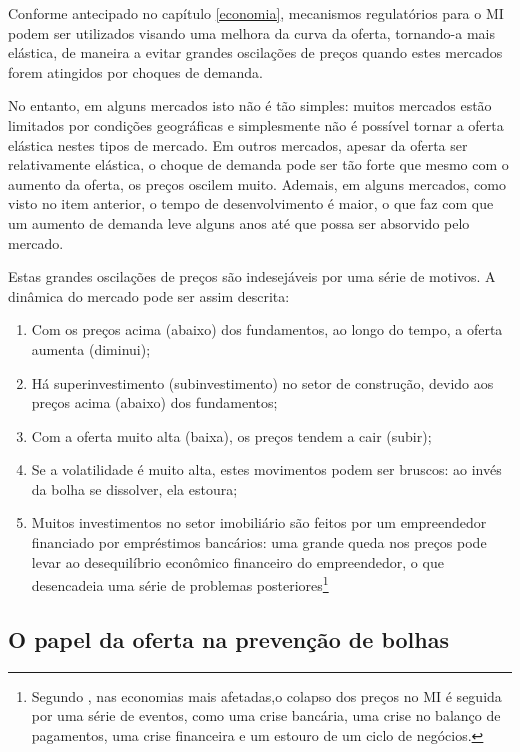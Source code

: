 \documentclass[
	12pt,				%
	oneside,			%
	a4paper,			%
	chapter=TITLE,		%
	section=TITLE,		%
	english,			%
	brazil				%
	]{abntex2}
\begin{document}
Conforme antecipado no capítulo \ref{economia}, mecanismos regulatórios para o
\gls{MI} podem ser utilizados visando uma melhora da curva da oferta, tornando-a
mais elástica, de maneira a evitar grandes oscilações de preços quando estes
mercados forem atingidos por choques de demanda.

No entanto, em alguns mercados isto não é tão simples: muitos mercados estão
limitados por condições geográficas e simplesmente não é possível tornar a
oferta elástica nestes tipos de mercado. Em outros mercados, apesar da oferta
ser relativamente elástica, o choque de demanda pode ser tão forte que mesmo com
o aumento da oferta, os preços oscilem muito. Ademais, em alguns mercados, como
visto no item anterior, o tempo de desenvolvimento é maior, o que faz com que
um aumento de demanda leve alguns anos até que possa ser absorvido pelo mercado.

Estas grandes oscilações de preços são indesejáveis por uma série de motivos.
A dinâmica do mercado pode ser assim descrita:
\begin{enumerate}
\def\labelenumi{\arabic{enumi}.}
\tightlist
\item
  Com os preços acima (abaixo) dos fundamentos, ao longo do tempo, a oferta
  aumenta (diminui);
\item
  Há superinvestimento (subinvestimento) no setor de construção, devido aos
  preços acima (abaixo) dos fundamentos;
\item
  Com a oferta muito alta (baixa), os preços tendem a cair (subir);
\item
  Se a volatilidade é muito alta, estes movimentos podem ser bruscos: ao invés
  da bolha se dissolver, ela estoura;
\item
  Muitos investimentos no setor imobiliário são feitos por um empreendedor
  financiado por empréstimos bancários: uma grande queda nos preços pode levar
  ao desequilíbrio econômico financeiro do empreendedor, o que desencadeia uma
  série de problemas posteriores\footnote{Segundo \textcite[p.~2]{Malpezzi2002TheRO}, nas economias mais afetadas,o colapso
    dos preços no \gls{MI} é seguida por uma série de eventos, como uma crise
    bancária, uma crise no balanço de pagamentos, uma crise financeira e um estouro
    de um ciclo de negócios.}
\end{enumerate}
\hypertarget{o-papel-da-oferta-na-prevenuxe7uxe3o-de-bolhas}{%
\subsection{O papel da oferta na prevenção de bolhas}\label{o-papel-da-oferta-na-prevenuxe7uxe3o-de-bolhas}}
\end{document}
